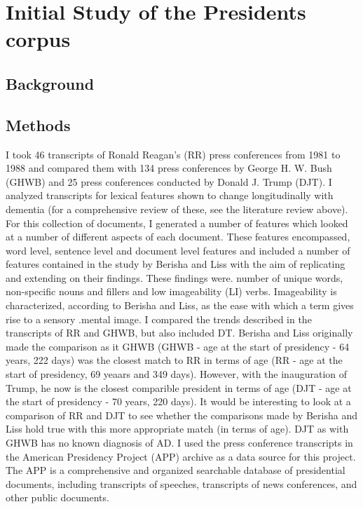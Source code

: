 \documentclass{article}
\begin{document}
\section{Initial Study of the Presidents corpus}


\subsection{Background}
\subsection{Methods}
I took 46 transcripts of Ronald Reagan’s (RR) press conferences from 1981 to 1988 and compared them with 134 press conferences by George H. W. Bush (GHWB) and 25 press conferences conducted by Donald J. Trump (DJT).  I analyzed transcripts for lexical features shown to change longitudinally with dementia  (for a comprehensive review of these, see the literature review above). For this collection of documents, I generated a number of features which looked at a number of different aspects of each document. These features encompassed, word level, sentence level and document level features and included a number of features contained in the study by Berisha and Liss with the aim of replicating and extending on their findings. These findings were. number of unique words, non-specific nouns and fillers and low imageability (LI) verbs. Imageability is characterized, according to Berisha and Liss, as the ease with which a term gives rise to a sensory .mental image. I compared the trends described in the transcripts of RR and GHWB, but also included DT. Berisha and Liss originally made the comparison as it GHWB (GHWB - age at the start of presidency - 64 years, 222 days) was the closest match to RR in terms of age (RR  - age at the start of presidency, 69 yeaars and 349 days). However, with the inauguration of Trump, he now is the closest comparible president in terms of age (DJT - age at the start of presidency - 70 years, 220 days). It would be interesting to look at a comparison of RR and DJT to see whether the comparisons made by Berisha and Liss hold true with this more appropriate match (in terms of age). DJT as with GHWB has no known diagnosis of AD. I used the press conference transcripts in the American Presidency Project (APP) archive as a data source for this project. The APP is a comprehensive and organized searchable database of presidential documents, including transcripts of speeches, transcripts of news conferences, and other public documents.
\end{document}
